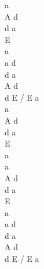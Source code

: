 \documentclass[a5paper, 10pt]{book}
\begin{document}
\begin{minipage}[t]{0.2\textwidth}
a\\
A d\\
d a\\
 E\\
 a\\

a d \\
d a \\
A d \\
d E / E a\\

a\\
A d\\
d a\\
 E\\
 a\\

 a\\
A d\\
d a\\
 E\\
 a\\

 a d \\
d a \\
A d \\
d E / E a\\

\end{minipage}

\newpage
\end{document}
